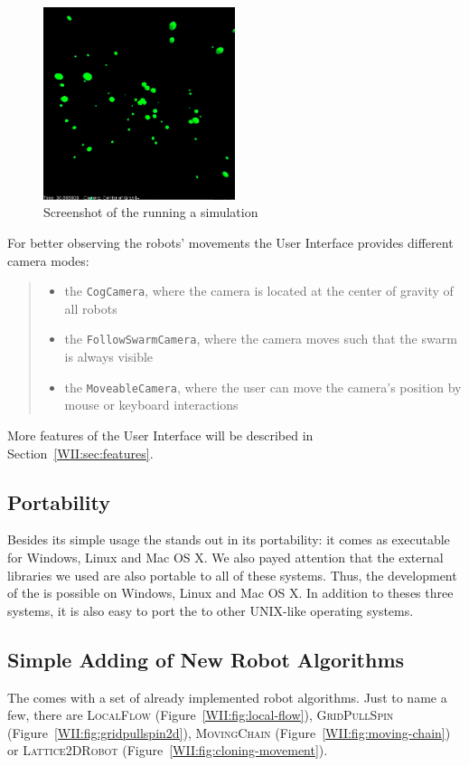 \begin{figure}[htp]
\centering
\includegraphics[width=0.5\textwidth]{chapter_whatitis_fig/simulator.png}
\caption{Screenshot of the \RSS running a simulation}
\label{WII:fig:simulator}
\end{figure}
For better observing the robots' movements the User Interface provides different camera modes: 
\begin{quote}
\begin{itemize}
	\item the \texttt{CogCamera}, where the camera is located at the center of gravity of all robots
	\item the \texttt{FollowSwarmCamera}, where the camera moves such that the swarm is always visible
	\item the \texttt{MoveableCamera}, where the user can move the camera's position by mouse or keyboard interactions
\end{itemize}
\end{quote}
More features of the User Interface will be described in Section~\ref{WII:sec:features}.\medskip

\subsection{Portability}
Besides its simple usage the \RSS stands out in its portability: it comes as executable for Windows, Linux and Mac OS X.
We also payed attention that the external libraries we used are also portable to all of these systems. Thus, the development of the \RSS is possible on Windows, Linux and Mac OS X. In addition to theses three systems, it is also easy to port the \RSS to  other UNIX-like operating systems.


\subsection{Simple Adding of New Robot Algorithms}
The \RSS comes with a set of already implemented robot algorithms. Just to name a few, there are 
\textsc{LocalFlow} (Figure~\ref{WII:fig:local-flow}),
\textsc{GridPullSpin} (Figure~\ref{WII:fig:gridpullspin2d}),
\textsc{MovingChain} (Figure~\ref{WII:fig:moving-chain}) or
\textsc{Lattice2DRobot} (Figure~\ref{WII:fig:cloning-movement}).\\


